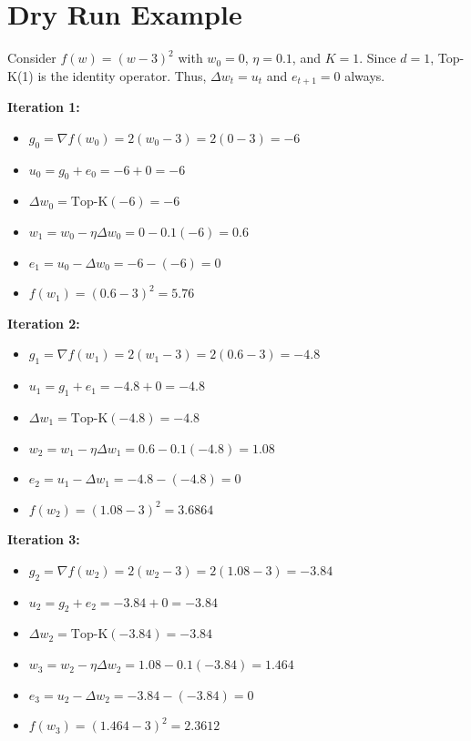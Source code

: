 \documentclass{article}
\begin{document}
\section*{Dry Run Example}
Consider $f(w) = (w-3)^2$ with $w_0 = 0$, $\eta = 0.1$, and $K = 1$. Since $d=1$, Top-K(1) is the identity operator. Thus, $\Delta w_t = u_t$ and $e_{t+1} = 0$ always.

\textbf{Iteration 1:}
\begin{itemize}
    \item $g_0 = \nabla f(w_0) = 2(w_0 - 3) = 2(0 - 3) = -6$
    \item $u_0 = g_0 + e_0 = -6 + 0 = -6$
    \item $\Delta w_0 = \text{Top-K}(-6) = -6$
    \item $w_1 = w_0 - \eta \Delta w_0 = 0 - 0.1(-6) = 0.6$
    \item $e_1 = u_0 - \Delta w_0 = -6 - (-6) = 0$
    \item $f(w_1) = (0.6 - 3)^2 = 5.76$
\end{itemize}

\textbf{Iteration 2:}
\begin{itemize}
    \item $g_1 = \nabla f(w_1) = 2(w_1 - 3) = 2(0.6 - 3) = -4.8$
    \item $u_1 = g_1 + e_1 = -4.8 + 0 = -4.8$
    \item $\Delta w_1 = \text{Top-K}(-4.8) = -4.8$
    \item $w_2 = w_1 - \eta \Delta w_1 = 0.6 - 0.1(-4.8) = 1.08$
    \item $e_2 = u_1 - \Delta w_1 = -4.8 - (-4.8) = 0$
    \item $f(w_2) = (1.08 - 3)^2 = 3.6864$
\end{itemize}

\textbf{Iteration 3:}
\begin{itemize}
    \item $g_2 = \nabla f(w_2) = 2(w_2 - 3) = 2(1.08 - 3) = -3.84$
    \item $u_2 = g_2 + e_2 = -3.84 + 0 = -3.84$
    \item $\Delta w_2 = \text{Top-K}(-3.84) = -3.84$
    \item $w_3 = w_2 - \eta \Delta w_2 = 1.08 - 0.1(-3.84) = 1.464$
    \item $e_3 = u_2 - \Delta w_2 = -3.84 - (-3.84) = 0$
    \item $f(w_3) = (1.464 - 3)^2 = 2.3612$
\end{itemize}

\newpage
\end{document}
